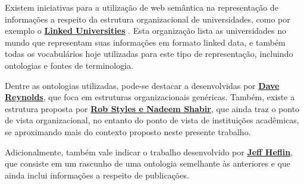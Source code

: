 
Existem iniciativas para a utilização de web semântica na representação de informações a respeito da estrutura organizacional de universidades, como por exemplo o \href{http://linkeduniversities.org/lu/index.php/vocabularies/index.html}{\textbf{Linked Universities}} . Esta organização lista as universidades no mundo que representam suas informações em formato linked data, e também todas os vocabulários hoje utilizadas para este tipo de representação, incluindo ontologias e fontes de terminologia.

Dentre as ontologias utilizadas, pode-se destacar a desenvolvidas por \href{http://www.epimorphics.com/public/vocabulary/org.html}{\textbf{Dave Reynolds}}, que foca em estruturas organizacionais genéricas. Também, existe a estrutura proposta por \href{http://vocab.org/aiiso/schema}{\textbf{Rob Styles e Nadeem Shabir}}, que ainda traz o ponto de vista organizacional, no entanto do ponto de vista de instituições acadêmicas, se aproximando mais do contexto proposto neste presente trabalho.

Adicionalmente, também vale indicar o trabalho desenvolvido por \href{https://www.cs.umd.edu/projects/plus/SHOE/onts/univ1.0.html}{\textbf{Jeff Heflin}}, que consiste em um rascunho de uma ontologia semelhante às anteriores e que ainda inclui informações a respeito de publicações. 